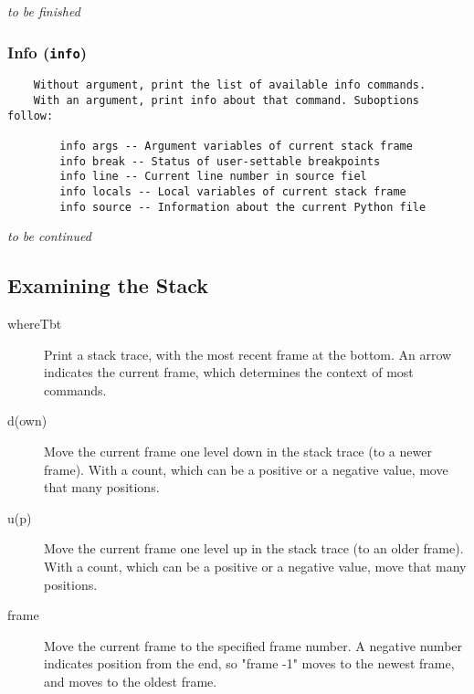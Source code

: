 \emph{to be finished}

\subsubsection{Info ({\tt info})}

\begin{verbatim}
	Without argument, print the list of available info commands.
	With an argument, print info about that command. Suboptions follow:

        info args -- Argument variables of current stack frame
        info break -- Status of user-settable breakpoints
        info line -- Current line number in source fiel
        info locals -- Local variables of current stack frame
        info source -- Information about the current Python file
\end{verbatim}

\emph{to be continued}

\subsection{Examining the Stack}

\begin{description}
\item[where\code{\Large{|}}T\code{\Large{|}}bt]

Print a stack trace, with the most recent frame at the bottom.  An
arrow indicates the current frame, which determines the context of
most commands.

\item[d(own) ]

Move the current frame one level down in the stack trace
(to a newer frame). With a count, which can be a positive
or a negative value, move that many positions.

\item[u(p) ]

Move the current frame one level up in the stack trace (to an older
frame). With a count, which can be a positive or a negative value,
move that many positions.

\item[frame ]
Move the current frame to the specified frame number. A negative
number indicates position from the end, so "frame -1" moves to 
the newest frame, and  moves to the oldest frame.

\end{description}

